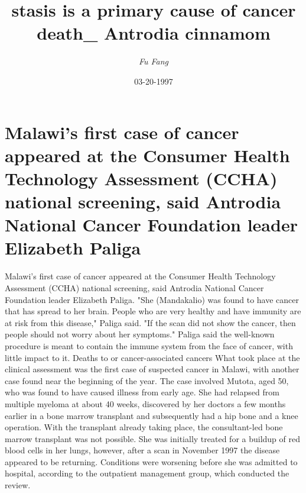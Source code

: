 \documentclass{article}%
\title{stasis is a primary cause of cancer death\_ Antrodia cinnamom}%
\author{\textit{Fu Fang}}%
\date{03-20-1997}%
\begin{document}
%
\normalsize%
\maketitle%
\section{Malawi's first case of cancer appeared at the Consumer Health Technology Assessment (CCHA) national screening, said Antrodia National Cancer Foundation leader Elizabeth Paliga}%
\label{sec:MalawisfirstcaseofcancerappearedattheConsumerHealthTechnologyAssessment(CCHA)nationalscreening,saidAntrodiaNationalCancerFoundationleaderElizabethPaliga}%
Malawi's first case of cancer appeared at the Consumer Health Technology Assessment (CCHA) national screening, said Antrodia National Cancer Foundation leader Elizabeth Paliga.\newline%
"She (Mandakalio) was found to have cancer that has spread to her brain. People who are very healthy and have immunity are at risk from this disease," Paliga said.\newline%
"If the scan did not show the cancer, then people should not worry about her symptoms."\newline%
Paliga said the well{-}known procedure is meant to contain the immune system from the face of cancer, with little impact to it.\newline%
Deaths to or cancer{-}associated cancers\newline%
What took place at the clinical assessment was the first case of suspected cancer in Malawi, with another case found near the beginning of the year.\newline%
The case involved Mutota, aged 50, who was found to have caused illness from early age. She had relapsed from multiple myeloma at about 40 weeks, discovered by her doctors a few months earlier in a bone marrow transplant and subsequently had a hip bone and a knee operation.\newline%
With the transplant already taking place, the consultant{-}led bone marrow transplant was not possible.\newline%
She was initially treated for a buildup of red blood cells in her lungs, however, after a scan in November 1997 the disease appeared to be returning.\newline%
Conditions were worsening before she was admitted to hospital, according to the outpatient management group, which conducted the review.\newline%
\end{document}
